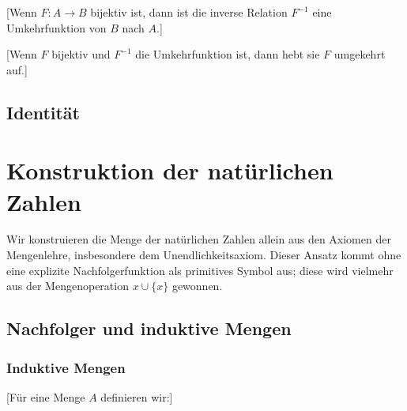 \documentclass[main.tex]{subfiles}
\begin{document}
[Wenn \(F\colon A \to B\) bijektiv ist, dann ist die inverse Relation \(F^{-1}\) eine Umkehrfunktion von \(B\) nach \(A\).]

[Wenn \(F\) bijektiv und \(F^{-1}\) die Umkehrfunktion ist, dann hebt sie \(F\) umgekehrt auf.]


\section{Identität}


\chapter{Konstruktion der natürlichen Zahlen}

Wir konstruieren die Menge der natürlichen Zahlen allein aus den Axiomen der Mengenlehre, insbesondere dem Unendlichkeitsaxiom.  Dieser Ansatz kommt ohne eine explizite Nachfolgerfunktion als primitives Symbol aus; diese wird vielmehr aus der Mengenoperation \(x \cup \{x\}\) gewonnen.


\section{Nachfolger und induktive Mengen}

\subsection{Induktive Mengen}

[Für eine Menge \(A\) definieren wir:]

\begin{tabproof}
\end{tabproof}
\end{document}
